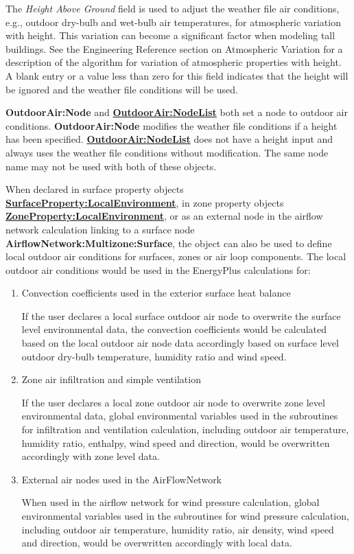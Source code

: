 The \emph{Height Above Ground} field is used to adjust the weather file air conditions, e.g., outdoor dry-bulb and wet-bulb air temperatures, for atmospheric variation with height. This variation can become a significant factor when modeling tall buildings. See the Engineering Reference section on Atmospheric Variation for a description of the algorithm for variation of atmospheric properties with height. A blank entry or a value less than zero for this field indicates that the height will be ignored and the weather file conditions will be used.

\textbf{OutdoorAir:Node} and \textbf{\hyperref[outdoorairnodelist]{OutdoorAir:\hyperref[nodelist]{NodeList}}} both set a node to outdoor air conditions. \textbf{OutdoorAir:Node} modifies the weather file conditions if a height has been specified. \textbf{\hyperref[outdoorairnodelist]{OutdoorAir:\hyperref[nodelist]{NodeList}}} does not have a height input and always uses the weather file conditions without modification. The same node name may not be used with both of these objects.

When declared in surface property objects \textbf{\hyperref[surfacePropertylocalEnvironment]{SurfaceProperty:LocalEnvironment}}, in zone property objects \textbf{\hyperref[ZonePropertylocalEnvironment]{ZoneProperty:LocalEnvironment}}, or as an external node in the airflow network calculation linking to a surface node \textbf{AirflowNetwork:Multizone:Surface}, the object can also be used to define local outdoor air conditions for surfaces, zones or air loop components. The local outdoor air conditions would be used in the EnergyPlus calculations for:
\begin{enumerate}
\item Convection coefficients used in the exterior surface heat balance

If the user declares a local surface outdoor air node to overwrite the surface level environmental data, the convection coefficients would be calculated based on the local outdoor air node data accordingly based on surface level outdoor dry-bulb temperature, humidity ratio and wind speed.

\item Zone air infiltration and simple ventilation

If the user declares a local zone outdoor air node to overwrite zone level environmental data, global environmental variables used in the subroutines for infiltration and ventilation calculation, including outdoor air temperature, humidity ratio, enthalpy, wind speed and direction, would be overwritten accordingly with zone level data.

\item External air nodes used in the AirFlowNetwork

When used in the airflow network for wind pressure calculation, global environmental variables used in the subroutines for wind pressure calculation, including outdoor air temperature, humidity ratio, air density, wind speed and direction, would be overwritten accordingly with local data.

\end{enumerate}

